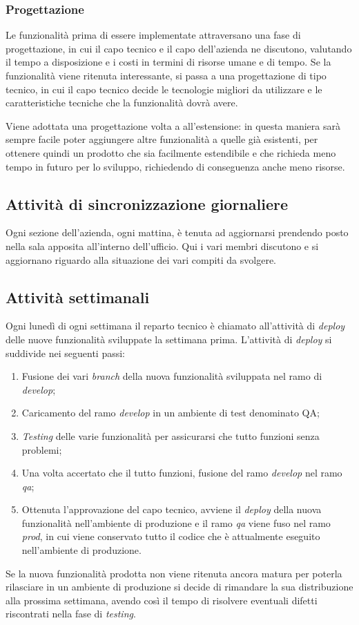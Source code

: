 \subsubsection{Progettazione}
Le funzionalità prima di essere implementate attraversano una fase di
progettazione, in cui il capo tecnico e il capo dell'azienda ne discutono,
valutando il tempo a disposizione e i costi in termini di risorse umane e di
tempo. Se la funzionalità viene ritenuta interessante, si passa a una
progettazione di tipo tecnico, in cui il capo tecnico decide le tecnologie
migliori da utilizzare e le caratteristiche tecniche che la funzionalità dovrà
avere.

Viene adottata una progettazione volta a all'estensione: in questa
maniera sarà sempre facile poter aggiungere altre funzionalità a quelle già
esistenti, per ottenere quindi un prodotto che sia facilmente estendibile e che
richieda meno tempo in futuro per lo sviluppo, richiedendo di conseguenza anche
meno risorse.

\subsection{Attività di sincronizzazione giornaliere}

Ogni sezione dell'azienda, ogni mattina, è tenuta ad aggiornarsi prendendo posto
nella sala apposita all'interno dell'ufficio. Qui i vari membri discutono e si
aggiornano riguardo alla situazione dei vari compiti da svolgere.

\subsection{Attività settimanali}
\label{intro:attivitaSettimanali}

Ogni lunedì di ogni settimana il reparto tecnico è chiamato all'attività di
\textit{deploy} delle nuove funzionalità sviluppate la settimana prima.
L'attività di \textit{deploy} si suddivide nei seguenti passi:
\begin{enumerate}

\item Fusione dei vari \textit{branch} della nuova funzionalità sviluppata nel
ramo di \textit{develop};
\item Caricamento del ramo \textit{develop} in un ambiente di test denominato
QA;
\item \textit{Testing} delle varie funzionalità per assicurarsi che tutto
funzioni senza problemi;
\item Una volta accertato che il tutto funzioni, fusione del ramo
\textit{develop} nel ramo \textit{qa};
\item Ottenuta l'approvazione del capo tecnico, avviene il \textit{deploy}
della nuova funzionalità nell'ambiente di produzione e il ramo \textit{qa}
viene fuso nel ramo \textit{prod}, in cui viene conservato tutto il codice che
è attualmente eseguito nell'ambiente di produzione.
\end{enumerate}

Se la nuova funzionalità prodotta non viene ritenuta ancora matura per poterla
rilasciare in un ambiente di produzione si decide di rimandare la sua
distribuzione alla prossima settimana, avendo così il tempo di risolvere
eventuali difetti riscontrati nella fase di \textit{testing}.
